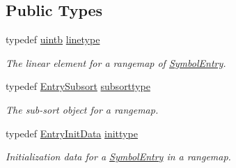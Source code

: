 \subsection*{Public Types}
\begin{DoxyCompactItemize}
\item 
typedef \mbox{\hyperlink{types_8h_a2db313c5d32a12b01d26ac9b3bca178f}{uintb}} \mbox{\hyperlink{class_symbol_entry_a314b03465bd3849ffe266057d69a7e37}{linetype}}
\begin{DoxyCompactList}\small\item\em The linear element for a rangemap of \mbox{\hyperlink{class_symbol_entry}{Symbol\+Entry}}. \end{DoxyCompactList}\item 
typedef \mbox{\hyperlink{class_symbol_entry_1_1_entry_subsort}{Entry\+Subsort}} \mbox{\hyperlink{class_symbol_entry_a3163188293595446b1f1dafccab7df15}{subsorttype}}
\begin{DoxyCompactList}\small\item\em The sub-\/sort object for a rangemap. \end{DoxyCompactList}\item 
typedef \mbox{\hyperlink{class_symbol_entry_1_1_entry_init_data}{Entry\+Init\+Data}} \mbox{\hyperlink{class_symbol_entry_adca9545cc0e46b574a9cf9fbb44cfca8}{inittype}}
\begin{DoxyCompactList}\small\item\em Initialization data for a \mbox{\hyperlink{class_symbol_entry}{Symbol\+Entry}} in a rangemap. \end{DoxyCompactList}\end{DoxyCompactItemize}

